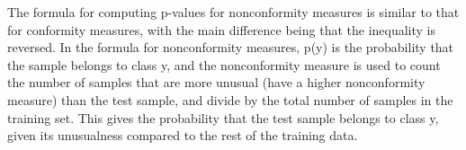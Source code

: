 The formula for computing p-values for nonconformity measures is similar to that for conformity measures, with the main difference being that the inequality is reversed. In the formula for nonconformity measures, p(y) is the probability that the sample belongs to class y, and the nonconformity measure is used to count the number of samples that are more unusual (have a higher nonconformity measure) than the test sample, and divide by the total number of samples in the training set. This gives the probability that the test sample belongs to class y, given its unusualness compared to the rest of the training data.
